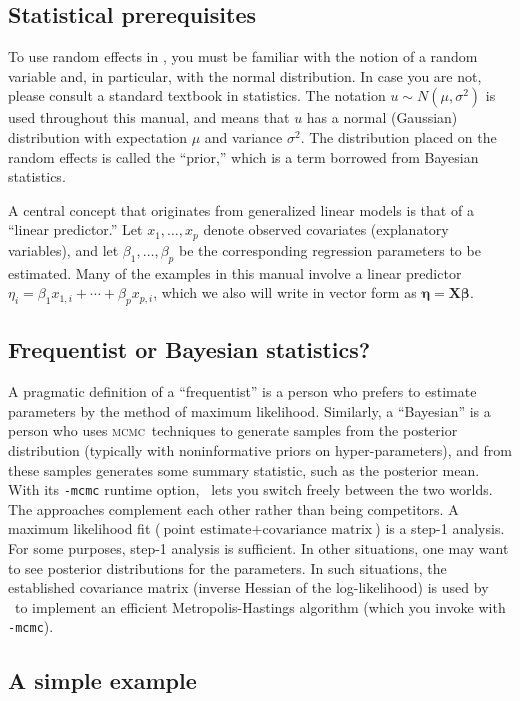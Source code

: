\documentclass{admbmanual}
\newcommand{\scMCMC}{\textsc{mcmc}}
\begin{document}
\subsection{Statistical prerequisites}

To use random effects in \scAB, you must be familiar with the notion of a random
variable and, in particular, with the normal distribution. In case you are not,
please consult a standard textbook in statistics. The notation $u\sim
N(\mu,\sigma^2)$ is used throughout this manual, and means that $u$ has a normal
(Gaussian) distribution with expectation $\mu$ and variance $\sigma^2$. The
distribution placed on the random effects is called the ``prior,'' which is a
term borrowed from Bayesian statistics.

A central concept that originates from generalized linear models is that of a
``linear predictor.'' Let $x_1,\ldots,x_p$ denote observed covariates
(explanatory variables), and let $\beta_1,\ldots,\beta_p$ be the corresponding
regression parameters to be estimated. Many of the examples in this manual
involve a linear predictor $\eta_i=\beta_1x_{1,i}+\cdots+\beta_px_{p,i}$, which
we also will write in vector form as $\mathbf{\eta}=\mathbf{X\beta}$.

\subsection{Frequentist or Bayesian statistics?}

A pragmatic definition of a ``frequentist'' is a person who prefers to estimate
parameters by the method of maximum likelihood. Similarly, a ``Bayesian'' is a
person who uses \scMCMC\ techniques to generate samples from the posterior
distribution (typically with noninformative priors on hyper-parameters), and
from these samples generates some summary statistic, such as the posterior mean.
With its \texttt{-mcmc} runtime option, \scAB\ lets you switch freely between
the two worlds. The approaches complement each other rather than being
competitors. A maximum likelihood fit ($\textrm{point estimate} +
\textrm{covariance matrix}$) is a step-1 analysis. For some purposes, step-1
analysis is sufficient. In other situations, one may want to see posterior
distributions for the parameters. In such situations, the established covariance
matrix (inverse Hessian of the log-likelihood) is used by \scAB\ to implement an
efficient Metropolis-Hastings algorithm (which you invoke with \texttt{-mcmc}).

\subsection{A simple example}
\end{document}
